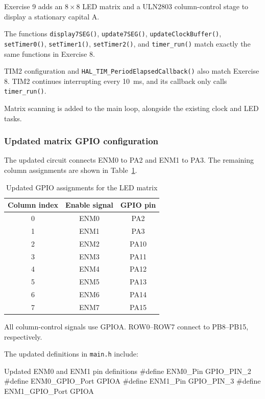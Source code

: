 \documentclass[a4paper]{article}
\begin{document}
Exercise 9 adds an $8 \times 8$ LED matrix and
a ULN2803 column-control stage to display
a stationary capital A.

The functions \texttt{display7SEG()},
\texttt{update7SEG()}, \texttt{updateClockBuffer()},
\texttt{setTimer0()}, \texttt{setTimer1()},
\texttt{setTimer2()}, and \texttt{timer\_run()}
match exactly the same functions in Exercise 8.

TIM2 configuration and
\texttt{HAL\_TIM\_PeriodElapsedCallback()}
also match Exercise 8. TIM2 continues interrupting
every 10~ms, and its callback only calls
\texttt{timer\_run()}.

Matrix scanning is added to the main loop,
alongside the existing clock and LED tasks.

\subsubsection{Updated matrix GPIO configuration}

The updated circuit connects ENM0 to PA2
and ENM1 to PA3. The remaining column
assignments are shown in
Table~\ref{tab:ex09-matrix-pins}.

\begin{table}[H]
    \centering
    \caption{Updated GPIO assignments for the LED matrix}
    \label{tab:ex09-matrix-pins}
    \begin{tabular}{ccc}
        \toprule
        \textbf{Column index} &
        \textbf{Enable signal} &
        \textbf{GPIO pin} \\
        \midrule
        0 & ENM0 & PA2  \\
        1 & ENM1 & PA3  \\
        2 & ENM2 & PA10 \\
        3 & ENM3 & PA11 \\
        4 & ENM4 & PA12 \\
        5 & ENM5 & PA13 \\
        6 & ENM6 & PA14 \\
        7 & ENM7 & PA15 \\
        \bottomrule
    \end{tabular}
\end{table}

All column-control signals use GPIOA.
ROW0--ROW7 connect to PB8--PB15, respectively.

The updated definitions in \texttt{main.h}
include:

\begin{stmcode}{Updated ENM0 and ENM1 pin definitions}
#define ENM0_Pin GPIO_PIN_2
#define ENM0_GPIO_Port GPIOA
#define ENM1_Pin GPIO_PIN_3
#define ENM1_GPIO_Port GPIOA
\end{stmcode}
\end{document}

